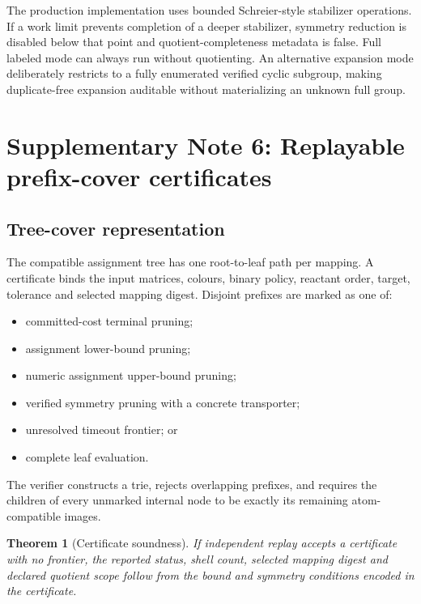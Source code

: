 \documentclass[11pt]{article}
\newtheorem{theorem}{Theorem}[section]
\theoremstyle{definition}
\begin{document}
The production implementation uses bounded Schreier-style stabilizer
operations.  If a work limit prevents completion of a deeper stabilizer,
symmetry reduction is disabled below that point and quotient-completeness
metadata is false.  Full labeled mode can always run without quotienting.  An
alternative expansion mode deliberately restricts to a fully enumerated
verified cyclic subgroup, making duplicate-free expansion auditable without
materializing an unknown full group.

\section{Supplementary Note 6: Replayable prefix-cover certificates}

\subsection{Tree-cover representation}

The compatible assignment tree has one root-to-leaf path per mapping.  A
certificate binds the input matrices, colours, binary policy, reactant order,
target, tolerance and selected mapping digest.  Disjoint prefixes are marked
as one of:

\begin{itemize}
\item committed-cost terminal pruning;
\item assignment lower-bound pruning;
\item numeric assignment upper-bound pruning;
\item verified symmetry pruning with a concrete transporter;
\item unresolved timeout frontier; or
\item complete leaf evaluation.
\end{itemize}

The verifier constructs a trie, rejects overlapping prefixes, and requires the
children of every unmarked internal node to be exactly its remaining
atom-compatible images.

\begin{theorem}[Certificate soundness]
If independent replay accepts a certificate with no frontier, the reported
status, shell count, selected mapping digest and declared quotient scope follow
from the bound and symmetry conditions encoded in the certificate.
\label{thm:si-certificate}
\end{theorem}
\end{document}
